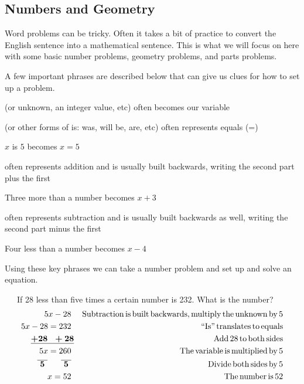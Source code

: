 \subsection{Numbers and Geometry}\pp

 {}\pp

 Word problems can be tricky. Often it takes a bit of practice to convert the
English sentence into a mathematical sentence. This is what we will focus on
here with some basic number problems, geometry problems, and parts problems.\pp

 A few important phrases are described below that can give us clues for how to
set up a problem.
\begin{itemizedot}
  \item {} (or unknown, an integer value, etc) often becomes our
  variable
  
  \item {} (or other forms of is: was, will be, are, etc) often
  represents equals (=)
  
  $x$ is $5$ becomes $x = 5$
  
  \item {} often represents addition and is usually built
  backwards, writing the second part plus the first
  
   Three more than a number becomes $x + 3$
  
  \item {} often represents subtraction and is usually
  built backwards as well, writing the second part minus the first
  
   Four less than a number becomes $x - 4$ 
\end{itemizedot}
 Using these key phrases we can take a number problem and set up and solve an equation.

\pagebreak

\begin{example}\label{Lin74}~~~If 28 less than five times a certain number is 232. What is the number?
  \begin{eqnarray*}
    5 x - 28~ &  & \operatorname{Subtraction} \operatorname{is} \operatorname{built} \operatorname{backwards},
    \operatorname{multiply} \operatorname{the} \operatorname{unknown} \operatorname{by} 5\\
    5 x - 28 = 232~ &  & \operatorname{``Is''} \operatorname{translates} \operatorname{to} \operatorname{equals}\\
    \boldsymbol{\underline{+ 28 ~~+ 28}} &  & \operatorname{Add} 28 \operatorname{to} \operatorname{both}
    \operatorname{sides}\\
    5 x = 260~ &  & \operatorname{The} \operatorname{variable} \operatorname{is} \operatorname{multiplied}
    \operatorname{by} 5\\
    \boldsymbol{\overline{~5~} ~~~~~ \overline{~5~}}~ &  & \operatorname{Divide} \operatorname{both}
    \operatorname{sides} \operatorname{by} 5\\
    x = 52~ &  & \operatorname{The} \operatorname{number} \operatorname{is} 52
  \end{eqnarray*}
\end{example}

